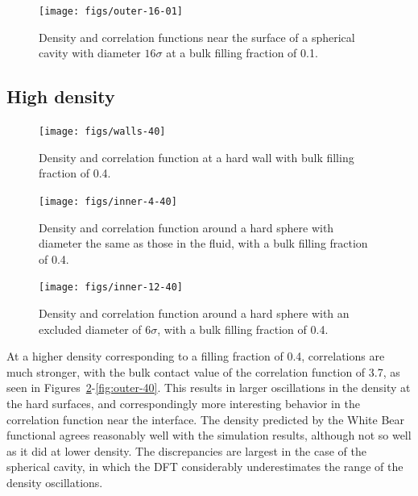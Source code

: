 \documentclass[letterpaper,amsmath,amssymb,10pt,pre]{revtex4-1}
\begin{document}
\begin{figure}
  \texttt{[image: figs/outer-16-01]}
  \caption{Density and correlation functions near the surface of a
    spherical cavity with diameter $16\sigma$ at a bulk filling
    fraction of 0.1.}
  \label{fig:outer-10}
\end{figure}





\subsection{High density}

\begin{figure}
  \texttt{[image: figs/walls-40]}
  \caption{Density and correlation function at a hard wall with bulk
    filling fraction of 0.4.}
  \label{fig:walls-40}
\end{figure}

\begin{figure}
  \texttt{[image: figs/inner-4-40]}
  \caption{Density and correlation function around a hard sphere with
    diameter the same as those in the fluid, with a bulk filling
    fraction of 0.4.}
  \label{fig:inner-4-40}
\end{figure}

\begin{figure}
  \texttt{[image: figs/inner-12-40]}
  \caption{Density and correlation function around a hard sphere with
    an excluded diameter of $6\sigma$, with a bulk filling fraction of
    0.4.}
  \label{fig:inner-12-40}
\end{figure}

At a higher density corresponding to a filling fraction of 0.4,
correlations are much stronger, with the bulk contact value of the
correlation function of 3.7, as seen in
Figures~\ref{fig:walls-40}-\ref{fig:outer-40}.  This results in larger
oscillations in the density at the hard surfaces, and correspondingly
more interesting behavior in the correlation function near the
interface.  The density predicted by the White Bear functional agrees
reasonably well with the simulation results, although not so well as
it did at lower density.  The discrepancies are largest in the case of
the spherical cavity, in which the DFT considerably underestimates the
range of the density oscillations.
\end{document}
